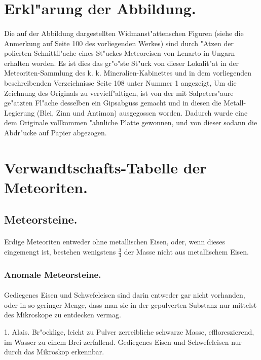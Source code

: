 \documentclass[a4paper, 11pt, oneside, polutonikogreek, german]{article}
\begin{document}
\section{Erkl"arung der Abbildung.}
\paragraph{}
Die auf der Abbildung dargestellten Widmanst"attenschen Figuren (siehe die Anmerkung auf Seite 100 des vorliegenden Werkes) sind durch "Atzen der polierten Schnittfl"ache eines St"uckes Meteoreisen von Lenarto in Ungarn erhalten worden. Es ist dies das gr"o"ste St"uck von dieser Lokalit"at in der Meteoriten-Sammlung des k. k. Mineralien-Kabinettes und in dem vorliegenden beschreibenden Verzeichnisse Seite 108 unter Nummer 1 angezeigt, Um die Zeichnung des Originals zu vervielf"altigen, ist von der mit Salpeters"aure ge"atzten Fl"ache desselben ein Gipsabguss gemacht und in diesen die Metall-Legierung (Blei, Zinn und Antimon) ausgegossen worden. Dadurch wurde eine dem Originale vollkommen "ahnliche Platte gewonnen, und von dieser sodann die Abdr"ucke auf Papier abgezogen.
\clearpage
\section{Verwandtschafts-Tabelle der Meteoriten.}
\subsection{Meteorsteine.}
\paragraph{}
Erdige Meteoriten entweder ohne metallischen Eisen, oder, wenn dieses eingemengt ist, bestehen wenigstens $\frac{3}{4}$ der Masse nicht aus metallischem Eisen.
\subsubsection{Anomale Meteorsteine.}
\paragraph{}
Gediegenes Eisen und Schwefeleisen sind darin entweder gar nicht vorhanden, oder in so geringer Menge, dass man sie in der gepulverten Substanz nur mittelst des Mikroskope zu entdecken vermag.

1. Alais. Br"ocklige, leicht zu Pulver zerreibliche schwarze Masse, effloreszierend, im Wasser zu einem Brei zerfallend. Gediegenes Eisen und Schwefeleisen nur durch das Mikroskop erkennbar.
\end{document}
